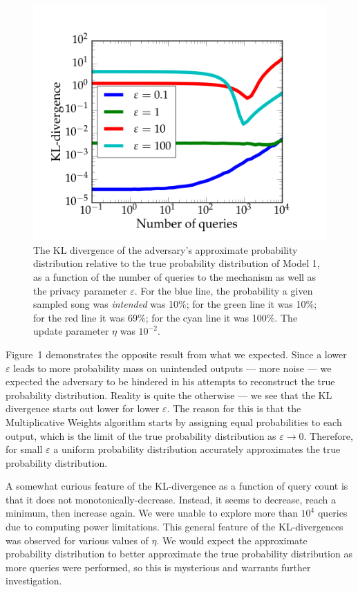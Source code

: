 \documentclass[preprint2]{aastex}
\begin{document}
\begin{figure}[H]
\vspace{-0.24cm}
\centering
\hspace*{-0.5cm}\includegraphics[width=1.2\textwidth]{model1_KL.png}
\caption{The KL divergence of the adversary's approximate probability distribution relative to the true probability distribution of Model 1, as a function of the number of queries to the mechanism as well as the privacy parameter \(\varepsilon\). For the blue line, the probability a given sampled song was \emph{intended} was 10\%; for the green line it was 10\%; for the red line it was 69\%; for the cyan line it was 100\%. The update parameter \(\eta\) was \(10^{-2}\).}
\end{figure}

Figure~1 demonstrates the opposite result from what we expected. Since a lower \(\varepsilon\) leads to more probability mass on unintended outputs --- more noise --- we expected the adversary to be hindered in his attempts to reconstruct the true probability distribution. Reality is quite the otherwise --- we see that the KL divergence starts out lower for lower \(\varepsilon\). The reason for this is that the Multiplicative Weights algorithm starts by assigning equal probabilities to each output, which is the limit of the true probability distribution as \(\varepsilon \rightarrow 0\). Therefore, for small \(\varepsilon\) a uniform probability distribution accurately approximates the true probability distribution.

A somewhat curious feature of the KL-divergence as a function of query count is that it does not monotonically-decrease. Instead, it seems to decrease, reach a minimum, then increase again. We were unable to explore more than \(10^4\) queries due to computing power limitations. This general feature of the KL-divergences was observed for various values of \(\eta\). We would expect the approximate probability distribution to better approximate the true probability distribution as more queries were performed, so this is mysterious and warrants further investigation.
\end{document}
